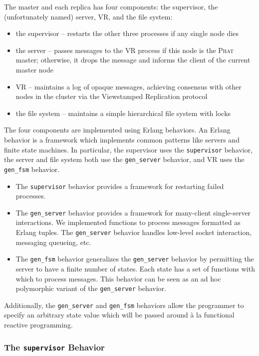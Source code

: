 \documentclass[10pt,letter]{article}
\newcommand{\phat}[0]{\textsc{Phat}}
\begin{document}
The master and each replica has four components: the supervisor, the
(unfortunately named) server, VR, and the file system:

\begin{itemize}
\item the supervisor -- restarts the other three processes if any single node dies
\item the server -- passes messages to the VR process if this node is the
  \phat{} master; otherwise, it drops the message and informs the client of the
  current master node
\item VR -- maintains a log of opaque messages, achieving consensus with other
  nodes in the cluster via the Viewstamped Replication protocol
\item the file system -- maintains a simple hierarchical file system with locks
\end{itemize}

The four components are implemented using Erlang behaviors. An Erlang behavior
is a framework which implements common patterns like servers and finite state
machines. In particular, the supervisor uses the \texttt{supervisor} behavior,
the server and file system both use the \texttt{gen\_server} behavior, and VR
uses the \texttt{gen\_fsm} behavior.

\begin{itemize}
\item The \texttt{supervisor} behavior provides a framework for restarting
  failed processes.
\item The \texttt{gen\_server} behavior provides a framework for many-client
  single-server interactions. We implemented functions to process messages
  formatted as Erlang tuples. The \texttt{gen\_server} behavior handles
  low-level socket interaction, messaging queueing, etc.
\item The \texttt{gen\_fsm} behavior generalizes the \texttt{gen\_server}
  behavior by permitting the server to have a finite number of states. Each
  state has a set of functions with which to process messages. This behavior can
  be seen as an ad hoc polymorphic variant of the \texttt{gen\_server} behavior.
\end{itemize}

Additionally, the \texttt{gen\_server} and \texttt{gen\_fsm} behaviors allow
the programmer to specify an arbitrary state value which will be passed around
\`{a} la functional reactive programming.

\subsubsection{The \texttt{supervisor} Behavior}
\end{document}
